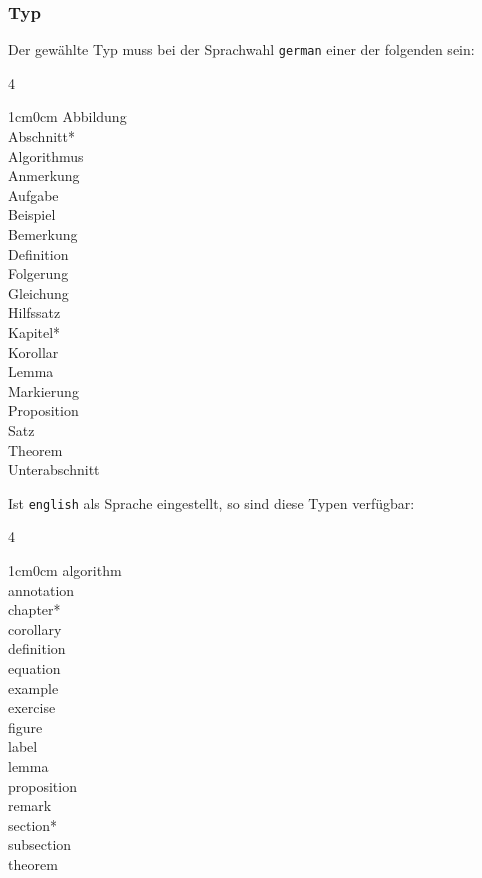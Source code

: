 \documentclass[parskip=off,index=totocnumbered]{scrartcl}
\newenvironment{rücknstück} %
	{\begin{adjustwidth}{1cm}{0cm}} 
	{\end{adjustwidth}}
\begin{document}
\subsubsection{Typ}
Der gewählte Typ muss bei der Sprachwahl \verb|german| einer der folgenden sein:
   
   \begin{multicols}{4}
      \begin{rücknstück}
         Abbildung\\Abschnitt*\\Algorithmus\\Anmerkung\\Aufgabe\\Beispiel\\Bemerkung\\Definition\\Folgerung\\Gleichung\\Hilfssatz\\Kapitel*\\Korollar\\Lemma\\Markierung\\Proposition\\Satz\\Theorem\\Unterabschnitt
      \end{rücknstück}
   \end{multicols}

\noindent Ist \verb|english| als Sprache eingestellt, so sind diese Typen verfügbar:
   \begin{multicols}{4}
      \begin{rücknstück}
         algorithm\\annotation\\chapter*\\corollary\\definition\\equation\\example\\exercise\\figure\\label\\lemma\\proposition\\remark\\section*\\subsection\\theorem
      \end{rücknstück}
   \end{multicols}
   
\end{document}
